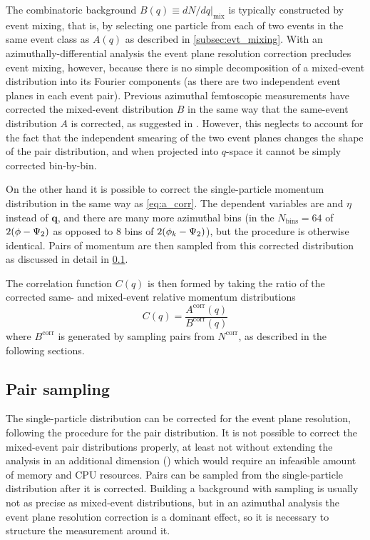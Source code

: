 The combinatoric background $B(q) \equiv \left. dN/dq \right|_{\textrm{mix}}$ is typically constructed by event mixing, that is, by selecting one particle from each of two events in the same event class as $A(q)$ as described in \cref{subsec:evt_mixing}.
With an azimuthally-differential analysis the event plane resolution correction precludes event mixing, however, because there is no simple decomposition of a mixed-event distribution into its Fourier components (as there are two independent event planes in each event pair).
Previous azimuthal femtoscopic measurements have corrected the mixed-event distribution $B$ in the same way that the same-event distribution $A$ is corrected, as suggested in .
However, this neglects to account for the fact that the independent smearing of the two event planes changes the shape of the pair distribution, and when projected into $q$-space it cannot be simply corrected bin-by-bin.

On the other hand it is possible to correct the single-particle momentum distribution in the same way as \cref{eq:a_corr}.
The dependent variables are \pt and $\eta$ instead of $\mathbf{q}$, and there are many more azimuthal bins (in \Eqn{\ref{eq:xi_def}} the $N_\textrm{bins} = 64$ of $2(\phi - \Psi_{2})$ as opposed to 8 bins of $2(\phi_{k} - \Psi_{2})$), but the procedure is otherwise identical.
Pairs of momentum are then sampled from this corrected distribution as discussed in detail in \cref{subsec:bkgd_sampling}.

The correlation function $C(q)$ is then formed by taking the ratio of the corrected same- and mixed-event relative momentum distributions
\begin{equation}
  C(q) = \frac{A^\textrm{corr}(q)}{B^\textrm{corr}(q)}
\end{equation}
where $B^\textrm{corr}$ is generated by sampling pairs from $N^\textrm{corr}$, as described in the following sections.

\subsection{Pair sampling}
\label{subsec:bkgd_sampling}
The single-particle distribution can be corrected for the event plane resolution, following the procedure for the pair distribution. It is not possible to correct the mixed-event pair distributions properly, at least not without extending the analysis in an additional dimension (\psit) which would require an infeasible amount of memory and CPU resources. Pairs can be sampled from the single-particle distribution after it is corrected. Building a background with sampling is usually not as precise as mixed-event distributions, but in an azimuthal analysis the event plane resolution correction is a dominant effect, so it is necessary to structure the measurement around it.

